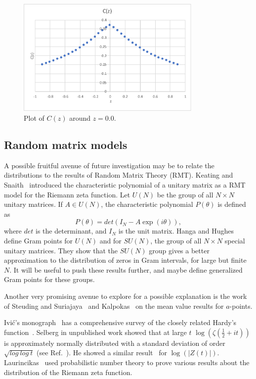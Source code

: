 \documentclass[twoside]{article}
\begin{document}
\begin{figure}
\centering
\includegraphics[width=0.8\textwidth]{Cz.pdf}
\caption[]{ 
 Plot of $C(z)$ around $z=0.0$. 
  }
\vspace{1mm}
\label{Cz}
\end{figure}


\subsection{\label{related}Random matrix models}
A possible fruitful avenue of future investigation may be to relate the distributions to 
the results of Random Matrix Theory (RMT).  Keating and  Snaith~\cite{Keating 2000a} introduced the 
characteristic polynomial of a unitary matrix as a RMT model for the Riemann zeta function. 
Let $U(N)$ be the group of  all $N \times N$ unitary matrices.
If $A \in U(N)$, the characteristic polynomial $P(\theta)$ is defined as
\begin{equation}
P(\theta) = det(I_N-A\exp {(i\theta)}),
\label{eq:uNeigen}
\end{equation}
where $det$ is the determinant, and $I_N$ is the unit matrix.
Hanga and Hughes~\cite{Hanga 2020} define Gram points for  $U(N)$ and 
for $SU(N)$, the group of 
all $N \times N$ special unitary matrices. They show that the $SU(N)$ group gives
a better approximation to the distribution of zeros in Gram intervals, for large but
finite $N$. It will be useful to push these results further, and maybe define 
generalized Gram points for these groups.

Another very promising avenue to explore for a possible explanation is the work of
Steuding and Suriajaya~\cite{Steuding 2020} and Kalpokas~\cite{kalpokas 2009} 
on the mean value results 
for $a$-points.

Ivi\'c's monograph~\cite{Ivic 2013} 
has a comprehensive survey of  the  closely related Hardy's function~\cite{Hardy 1918}.
Selberg in unpublished work showed that at large $t$ $\log (\zeta(\frac{1}{2} + it))$ is 
approximately normally distributed with a standard deviation of 
order $\sqrt{log~log~t}$ (see Ref.~\cite{Hejhal}). He showed a 
similar result~\cite{Selberg 1989, Selberg 1991} for $\log (|Z(t)|)$. 
Laurincikas~\cite{Laurincikas}  used probabilistic number theory to prove various results 
about the distribution of the Riemann zeta function.
\end{document}
